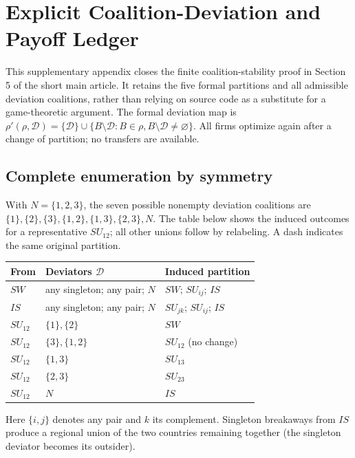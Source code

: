 \section{Explicit Coalition-Deviation and Payoff Ledger}\label{app:short-coalition-ledger}
This supplementary appendix closes the finite coalition-stability proof in
Section 5 of the short main article. It retains the five formal partitions and
all admissible deviation coalitions, rather than relying on source code as a
substitute for a game-theoretic argument. The formal deviation map is
$\rho'(\rho,\mathcal D)=\{\mathcal D\}\cup
\{B\setminus\mathcal D:B\in\rho,B\setminus\mathcal D\ne\varnothing\}$.
All firms optimize again after a change of partition; no transfers are available.

\subsection{Complete enumeration by symmetry}
With $N=\{1,2,3\}$, the seven possible nonempty deviation coalitions are
$\{1\},\{2\},\{3\},\{1,2\},\{1,3\},\{2,3\},N$. The table below
shows the induced outcomes for a representative $SU_{12}$; all other unions
follow by relabeling. A dash indicates the same original partition.
\begin{center}\small
\begin{tabular}{@{}lll@{}}\toprule
From & Deviators $\mathcal D$ & Induced partition \\
\midrule
$SW$ & any singleton; any pair; $N$ & $SW$; $SU_{ij}$; $IS$\\
$IS$ & any singleton; any pair; $N$ & $SU_{jk}$; $SU_{ij}$; $IS$\\
$SU_{12}$ & $\{1\},\{2\}$ & $SW$\\
$SU_{12}$ & $\{3\},\{1,2\}$ & $SU_{12}$ (no change)\\
$SU_{12}$ & $\{1,3\}$ & $SU_{13}$\\
$SU_{12}$ & $\{2,3\}$ & $SU_{23}$\\
$SU_{12}$ & $N$ & $IS$\\
\bottomrule\end{tabular}
\end{center}
Here $\{i,j\}$ denotes any pair and $k$ its complement. Singleton
breakaways from $IS$ produce a regional union of the two countries remaining
together (the singleton deviator becomes its outsider).


